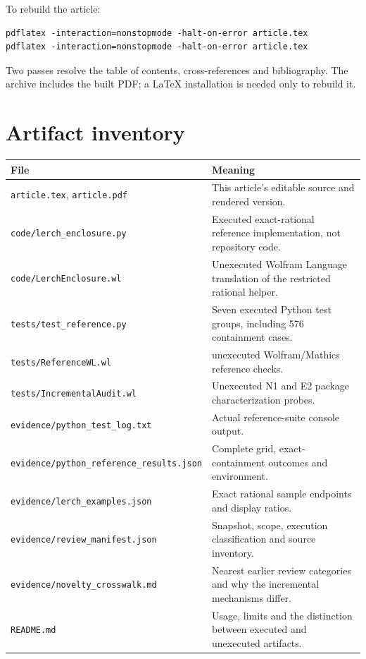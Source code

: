 \documentclass[11pt,a4paper]{article}
\newcommand{\code}[1]{\nolinkurl{#1}}
\begin{document}
To rebuild the article:
\begin{lstlisting}
pdflatex -interaction=nonstopmode -halt-on-error article.tex
pdflatex -interaction=nonstopmode -halt-on-error article.tex
\end{lstlisting}
Two passes resolve the table of contents, cross-references and bibliography. The archive includes the built PDF; a LaTeX installation is needed only to rebuild it.

\section{Artifact inventory}
\begin{longtable}{@{}>{\raggedright\arraybackslash}p{7.2cm}>{\raggedright\arraybackslash}p{8.1cm}@{}}
\toprule File & Meaning\\\midrule\endhead
\code{article.tex}, \code{article.pdf} & This article's editable source and rendered version.\\
\code{code/lerch_enclosure.py} & Executed exact-rational reference implementation, not repository code.\\
\code{code/LerchEnclosure.wl} & Unexecuted Wolfram Language translation of the restricted rational helper.\\
\code{tests/test_reference.py} & Seven executed Python test groups, including 576 containment cases.\\
\code{tests/ReferenceWL.wl} & 108 unexecuted Wolfram/Mathics reference checks.\\
\code{tests/IncrementalAudit.wl} & Unexecuted N1 and E2 package characterization probes.\\
\code{evidence/python_test_log.txt} & Actual reference-suite console output.\\
\code{evidence/python_reference_results.json} & Complete grid, exact-containment outcomes and environment.\\
\code{evidence/lerch_examples.json} & Exact rational sample endpoints and display ratios.\\
\code{evidence/review_manifest.json} & Snapshot, scope, execution classification and source inventory.\\
\code{evidence/novelty_crosswalk.md} & Nearest earlier review categories and why the incremental mechanisms differ.\\
\code{README.md} & Usage, limits and the distinction between executed and unexecuted artifacts.\\
\bottomrule
\end{longtable}
\end{document}

